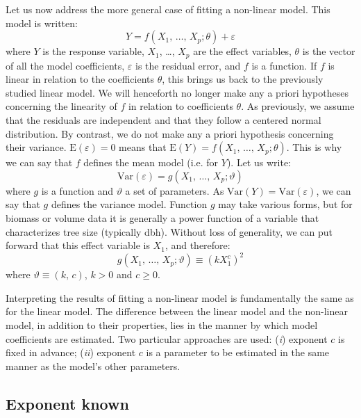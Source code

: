 Let us now address the more general case of fitting a non-linear model. This model is written:
\[
Y=f(X_1,\,\ldots,\,X_p;\theta)+\varepsilon
\]
where $Y$ is the response variable, $X_1$, \ldots, $X_p$ are the effect variables, $\theta$ is the vector of all the model coefficients, $\varepsilon$ is the residual error, and $f$ is a function. If $f$ is linear in relation to the coefficients $\theta$, this brings us back to the previously studied linear model. We will henceforth no longer make any a priori hypotheses concerning the linearity of $f$ in relation to coefficients $\theta$. As previously, we assume that the residuals are independent and that they follow a centered normal distribution. By contrast, we do not make any a priori hypothesis concerning their variance. $\mathrm{E}(\varepsilon)=0$ means that $\mathrm{E}(Y)=f(X_1,\,\ldots,\,X_p;\theta)$. This is why we can say that $f$ defines the mean model (i.e. for $Y$). Let us write:
\[
\mathrm{Var}(\varepsilon)=g(X_1,\,\ldots,\,X_p;\vartheta)
\]
where $g$ is a function and $\vartheta$ a set of parameters.
As $\mathrm{Var}(Y)=\mathrm{Var}(\varepsilon)$, we can say that $g$ defines the variance model. Function $g$ may take various forms, but for biomass or volume data it is generally a power function of a variable that characterizes tree size (typically dbh). Without loss of generality, we can put forward that this effect variable is $X_1$, and therefore:
\[
g(X_1,\,\ldots,\,X_p;\vartheta)\equiv(kX_1^c)^2
\]
where $\vartheta\equiv(k,\,c)$, $k>0$ and $c\geq0$.

Interpreting the results of fitting a non-linear model is fundamentally the same as for the linear model. The difference between the linear model and the non-linear model, in addition to their properties, lies in the manner by which model coefficients are estimated. Two particular approaches are used: (\emph{i}) exponent $c$ is fixed in advance; (\emph{ii}) exponent $c$ is a parameter to be estimated in the same manner as the model's other parameters.

\subsection{Exponent known}

